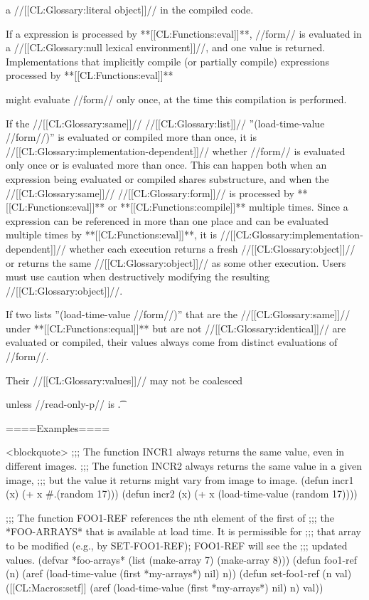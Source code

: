a //[[CL:Glossary:literal object]]// in the compiled code.

If a  expression is processed by **[[CL:Functions:eval]]**, //form// is evaluated in a //[[CL:Glossary:null lexical environment]]//, and one value is returned. Implementations that implicitly compile (or partially compile) expressions processed by **[[CL:Functions:eval]]**

might evaluate //form// only once, at the time this compilation is performed.


If the //[[CL:Glossary:same]]// //[[CL:Glossary:list]]// ''(load-time-value //form//)'' is evaluated or compiled more than once, it is //[[CL:Glossary:implementation-dependent]]// whether //form// is evaluated only once or is evaluated more than once. This can happen both when an expression being evaluated or compiled shares substructure, and when the //[[CL:Glossary:same]]// //[[CL:Glossary:form]]// is processed by **[[CL:Functions:eval]]** or **[[CL:Functions:compile]]** multiple times. Since a  expression can be referenced in more than one place and can be evaluated multiple times by **[[CL:Functions:eval]]**, it is //[[CL:Glossary:implementation-dependent]]// whether each execution returns a fresh //[[CL:Glossary:object]]// or returns the same //[[CL:Glossary:object]]// as some other execution. Users must use caution when destructively modifying the resulting //[[CL:Glossary:object]]//.

If two lists ''(load-time-value //form//)'' that are the //[[CL:Glossary:same]]// under **[[CL:Functions:equal]]** but are not //[[CL:Glossary:identical]]// are evaluated or compiled, their values always come from distinct evaluations of //form//.

Their //[[CL:Glossary:values]]// may not be coalesced

unless //read-only-p// is \t.

====Examples====

<blockquote> ;;; The function INCR1 always returns the same value, even in different images. ;;; The function INCR2 always returns the same value in a given image, ;;; but the value it returns might vary from image to image. (defun incr1 (x) (+ x #.(random 17))) (defun incr2 (x) (+ x (load-time-value (random 17))))

;;; The function FOO1-REF references the nth element of the first of ;;; the *FOO-ARRAYS* that is available at load time. It is permissible for ;;; that array to be modified (e.g., by SET-FOO1-REF); FOO1-REF will see the ;;; updated values. (defvar *foo-arrays* (list (make-array 7) (make-array 8))) (defun foo1-ref (n) (aref (load-time-value (first *my-arrays*) nil) n)) (defun set-foo1-ref (n val) ([[CL:Macros:setf]] (aref (load-time-value (first *my-arrays*) nil) n) val))

